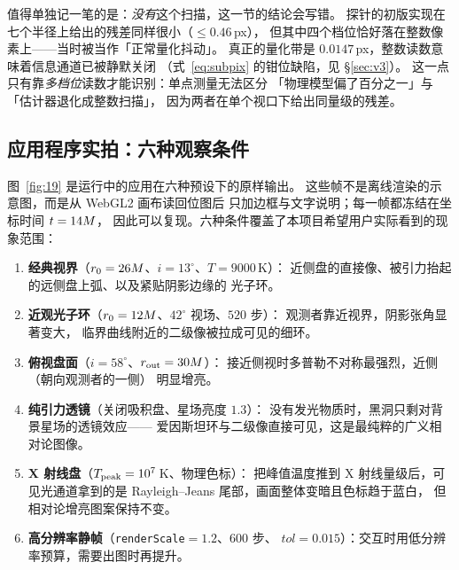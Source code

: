 值得单独记一笔的是：\emph{没有}这个扫描，这一节的结论会写错。
探针的初版实现在七个半径上给出的残差同样很小（$\le0.46$\,px），
但其中四个档位恰好落在整数像素上——当时被当作「正常量化抖动」。
真正的量化带是 $0.0147$\,px，整数读数意味着信息通道已被静默关闭
（式~\eqref{eq:subpix} 的钳位缺陷，见 \S\ref{sec:v3}）。
这一点只有靠\emph{多档位}读数才能识别：单点测量无法区分
「物理模型偏了百分之一」与「估计器退化成整数扫描」，
因为两者在单个视口下给出同量级的残差。



\FloatBarrier

\subsection{应用程序实拍：六种观察条件}\label{sec:gallery}

图~\ref{fig:19} 是运行中的应用在六种预设下的原样输出。
这些帧不是离线渲染的示意图，而是从 WebGL2 画布读回位图后
只加边框与文字说明；每一帧都冻结在坐标时间 $t=14M$，
因此可以复现。六种条件覆盖了本项目希望用户实际看到的现象范围：

\begin{enumerate}[leftmargin=1.8em,itemsep=1pt,topsep=3pt]
  \item \textbf{经典视界}（$r_0=26M$、$i=13^\circ$、$T=9000$\,K）：
        近侧盘的直接像、被引力抬起的远侧盘上弧、以及紧贴阴影边缘的
        光子环。
  \item \textbf{近观光子环}（$r_0=12M$、$42^\circ$ 视场、$520$ 步）：
        观测者靠近视界，阴影张角显著变大，
        临界曲线附近的二级像被拉成可见的细环。
  \item \textbf{俯视盘面}（$i=58^\circ$、$r_{\rm out}=30M$）：
        接近侧视时多普勒不对称最强烈，近侧（朝向观测者的一侧）
        明显增亮。
  \item \textbf{纯引力透镜}（关闭吸积盘、星场亮度 $1.3$）：
        没有发光物质时，黑洞只剩对背景星场的透镜效应——
        爱因斯坦环与二级像直接可见，这是最纯粹的广义相对论图像。
  \item \textbf{X 射线盘}（$T_{\rm peak}=10^7$\,K、物理色标）：
        把峰值温度推到 X 射线量级后，可见光通道拿到的是
        Rayleigh--Jeans 尾部，画面整体变暗且色标趋于蓝白，
        但相对论增亮图案保持不变。
  \item \textbf{高分辨率静帧}（\texttt{renderScale}$=1.2$、$600$ 步、
        $tol=0.015$）：交互时用低分辨率预算，需要出图时再提升。
\end{enumerate}

